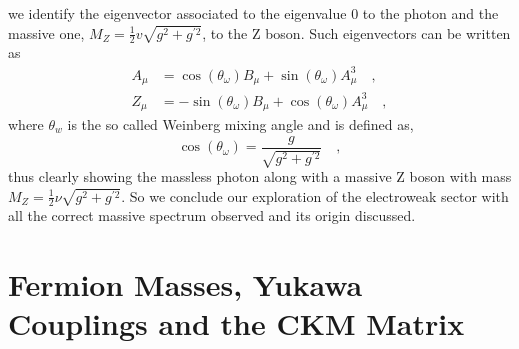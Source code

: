 %
we identify the eigenvector associated to the eigenvalue 0 to the photon and the massive one, $ M_Z =  \frac{1}{2} v \sqrt{g^2 + g^{\prime 2}} $, to the Z boson. Such eigenvectors can be written as
%
\begin{align}
A_\mu &=\cos(\theta_\omega) B_\mu + \sin(\theta_\omega) A_\mu^3 \quad ,  \\  
Z_\mu & =- \sin(\theta_\omega) B_\mu + \cos(\theta_\omega) A_\mu^3 \quad , 
\end{align}
%
where $\theta_w$ is the so called Weinberg mixing angle and is defined as, 
\begin{equation}
\cos(\theta_\omega)=\frac{g}{ \sqrt{g^2 + g^{\prime 2}}} \quad , 
\end{equation}
thus clearly showing the massless photon along with a massive Z boson with mass $M_Z= \frac{1}{2} \nu \sqrt{g^2 + g^{\prime 2}} $. 
%
So we conclude our exploration of the electroweak sector with all the correct massive spectrum observed and its origin discussed.


\section{Fermion Masses, Yukawa Couplings and the CKM Matrix}

